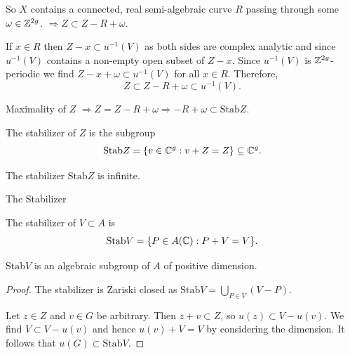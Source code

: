 \documentclass{beamer}
\begin{document}
\begin{frame}
  So $X$ contains a connected, real semi-algebraic curve $R$ passing
  through some $\omega\in{\mathbb{Z}}^{2g}$.  $\Rightarrow Z\subset Z-R+\omega$.

  If $x\in R$ then $Z-x\subset u^{-1}(V)$ as
  both sides are complex analytic and since $u^{-1}(V)$ contains a
  non-empty open subset of $Z-x$. Since $u^{-1}(V)$ is
  ${\mathbb{Z}}^{2g}$-periodic
  we find $Z-x+\omega\subset u^{-1}(V)$ for all $x\in
  R$. Therefore,
  \begin{equation*}
    Z\subset Z-R+\omega \subset u^{-1}(V).
  \end{equation*}

  Maximality of $Z$ $\Rightarrow Z = Z-R+\omega \Rightarrow
  -R+\omega \subset \mathrm{Stab} Z$.

  \begin{definition}
    The \alert{stabilizer}
       of $Z$ is the subgroup
    \begin{equation*}
      \mathrm{Stab} Z = \{v\in {\mathbb{C}}^g : v+Z=Z\} \subseteq{\mathbb{C}}^g.
    \end{equation*}
  \end{definition}

  \begin{lemma}
    The stabilizer $\mathrm{Stab} Z$ is infinite. 
  \end{lemma}
\end{frame}

\begin{frame}{The Stabilizer}
  \begin{definition}
    The \alert{stabilizer} of $V\subset A$ is
    \begin{equation*}
      \mathrm{Stab} V = \{P\in A({\mathbb{C}}) : P+V=V\}. 
    \end{equation*}
  \end{definition}


  \begin{lemma}
     $\mathrm{Stab} V$ is an algebraic subgroup of $A$ of
    positive dimension.
  \end{lemma}
  \begin{proof}
    The stabilizer is Zariski closed as
      $\mathrm{Stab} V = \bigcup_{P \in V} (V-P)$.
    
    Let $z\in Z$ and $v\in G$ be arbitrary. Then $z+v\subset Z$,
    so $u(z) \subset V-u(v)$. We find $V\subset V-u(v)$ and hence
    $u(v)+V=V$ by considering the dimension.
    It follows that 
    $u(G) \subset\mathrm{Stab} V$.  
  \end{proof}  
\end{frame}
\end{document}
